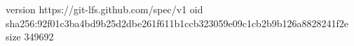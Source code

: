 version https://git-lfs.github.com/spec/v1
oid sha256:92f01c3ba4bd9b25d2dbe261f611b1ccb323059e09c1cb2b9b126a8828241f2e
size 349692
